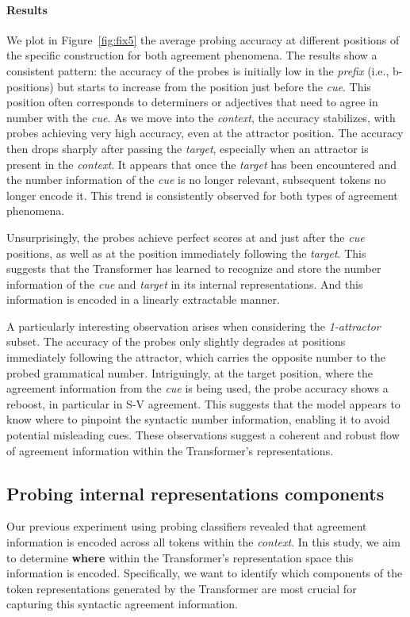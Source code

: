 \paragraph{Results} 
We plot in Figure~\ref{fig:fix5} the average probing accuracy at different positions of the specific construction for both agreement phenomena. The results show a consistent pattern: the accuracy of the probes is initially low in the \emph{prefix} (i.e., b-positions) but starts to increase from the position just before the \emph{cue}. This position often corresponds to determiners or adjectives that need to agree in number with the \emph{cue}. As we move into the \emph{context}, the accuracy stabilizes, with probes achieving very high accuracy, even at the attractor position. The accuracy then drops sharply after passing the \emph{target}, especially when an attractor is present in the \emph{context}. It appears that once the \emph{target} has been encountered and the number information of the \emph{cue} is no longer relevant, subsequent tokens no longer encode it. This trend is consistently observed for both types of agreement phenomena. 

Unsurprisingly, the probes achieve perfect scores at and just after the \emph{cue} positions, as well as at the position immediately following the \emph{target}. This suggests that the Transformer has learned to recognize and store the number information of the \emph{cue} and \emph{target} in its internal representations. And this information is encoded in a linearly extractable manner.  

A particularly interesting observation arises when considering the \textit{1-attractor} subset. The accuracy of the probes only slightly degrades at positions immediately following the attractor, which carries the opposite number to the probed grammatical number. Intriguingly, at the target position, where the agreement information from the \emph{cue} is being used, the probe accuracy shows a reboost, in particular in S-V agreement. This suggests that the model appears to know where to pinpoint the syntactic number information, enabling it to avoid potential misleading cues. These observations suggest a coherent and robust flow of agreement information within the Transformer's representations. 


\subsection{Probing internal representations components} \label{sec:within_repr} 
Our previous experiment using probing classifiers revealed that agreement
information is encoded across all tokens within the \emph{context}. In this study, we aim to determine \textbf{where} within the Transformer's representation space this information is encoded. Specifically, we want to identify which components of the token representations generated by the Transformer are most crucial for capturing this syntactic agreement information.

